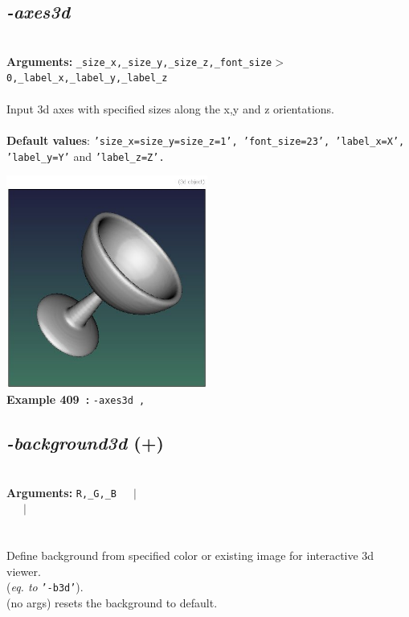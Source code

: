 \documentclass[a4paper,11pt,twoside]{book}
\begin{document}
\subsection{\emph{-axes3d} }\vspace*{-0.5em}
~\\\textbf{Arguments: } 
{\small \texttt{\_size\_x,\_size\_y,\_size\_z,\_font\_size$>$0,\_label\_x,\_label\_y,\_label\_z}}\\~\\
Input 3d axes with specified sizes along the x,y and z orientations.
~\\~\\\textbf{Default values}: {\small \texttt{'size\_x=size\_y=size\_z=1', 'font\_size=23', 'label\_x=X', 'label\_y=Y'} and \texttt{'label\_z=Z'.}}
\begin{center}\includegraphics[keepaspectratio=true,height=7cm,width=\textwidth]{img/gmic_def409.jpg}\\
{\footnotesize \textbf{Example 409~:} \texttt{-axes3d ,}}
\end{center}

\subsection{\emph{-background3d} (+)}\vspace*{-0.5em}
~\\\textbf{Arguments: } 
{\small \texttt{R,\_G,\_B}}~~~$|$\\
\hspace*{2.2cm}{\small \texttt{[image]}}~~~$|$\\
\\~\\
Define background from specified color or existing image for interactive 3d viewer.
~\\(\emph{eq. to} {\small \texttt{'-b3d'}}).
~\\(no args) resets the background to default.
\end{document}
